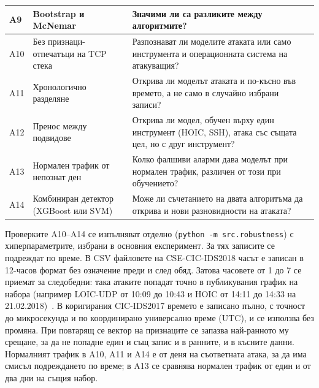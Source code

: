 \begin{table}[!htbp]
\begin{tabularx}{\textwidth}{@{}l p{4.4cm} L@{}}
A9 & Bootstrap и McNemar & Значими ли са разликите между алгоритмите?\\
\midrule
A10 & Без признаци-отпечатъци на TCP стека & Разпознават ли моделите атаката или само инструмента и операционната система на атакуващия?\\
A11 & Хронологично разделяне & Открива ли моделът атаката и по-късно във времето, а не само в случайно избрани записи?\\
A12 & Пренос между подвидове & Открива ли модел, обучен върху един инструмент (HOIC, SSH), атака със същата цел, но с друг инструмент?\\
A13 & Нормален трафик от непознат ден & Колко фалшиви аларми дава моделът при нормален трафик, различен от този при обучението?\\
A14 & Комбиниран детектор (XGBoost или SVM) & Може ли съчетанието на двата алгоритъма да открива и нови разновидности на атаката?\\
\bottomrule
\end{tabularx}
\end{table}

Проверките A10--A14 се изпълняват отделно (\texttt{python -m src.robustness}) с хиперпараметрите, избрани в основния експеримент. За тях записите се подреждат по време. В CSV файловете на CSE-CIC-IDS2018 часът е записан в 12-часов формат без означение преди и след обяд. Затова часовете от 1 до 7 се приемат за следобедни: така атаките попадат точно в публикувания график на набора (например LOIC-UDP от 10:09 до 10:43 и HOIC от 14:11 до 14:33 на 21.02.2018)~\cite{sharafaldin2018}. В коригирания CIC-IDS2017 времето е записано пълно, с точност до микросекунда и по координирано универсално време (UTC), и се използва без промяна. При повтарящ се вектор на признаците се запазва най-ранното му срещане, за да не попадне един и същ запис и в ранните, и в късните данни. Нормалният трафик в A10, A11 и A14 е от деня на съответната атака, за да има смисъл подреждането по време; в A13 се сравнява нормален трафик от един и от два дни на същия набор.


